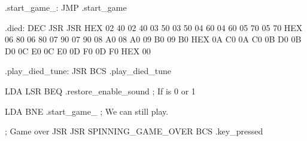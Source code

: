 \documentclass[10pt]{report}%
\begin{document}
.start_game_:
    JMP     .start_game

.died:
    DEC     
    JSR     
    JSR     
    HEX     02 40 02 40 03 50 03 50 04 60 04 60 05 70 05 70
    HEX     06 80 06 80 07 90 07 90 08 A0 08 A0 09 B0 09 B0
    HEX     0A C0 0A C0 0B D0 0B D0 0C E0 0C E0 0D F0 0D F0
    HEX     00

.play_died_tune:
    JSR     
    BCS     .play_died_tune

    LDA     
    LSR
    BEQ     .restore_enable_sound     ; If  is 0 or 1

    LDA     
    BNE     .start_game_    ; We can still play.

    ; Game over
    JSR     
    JSR     SPINNING_GAME_OVER
    BCS     .key_pressed
\end{document}
